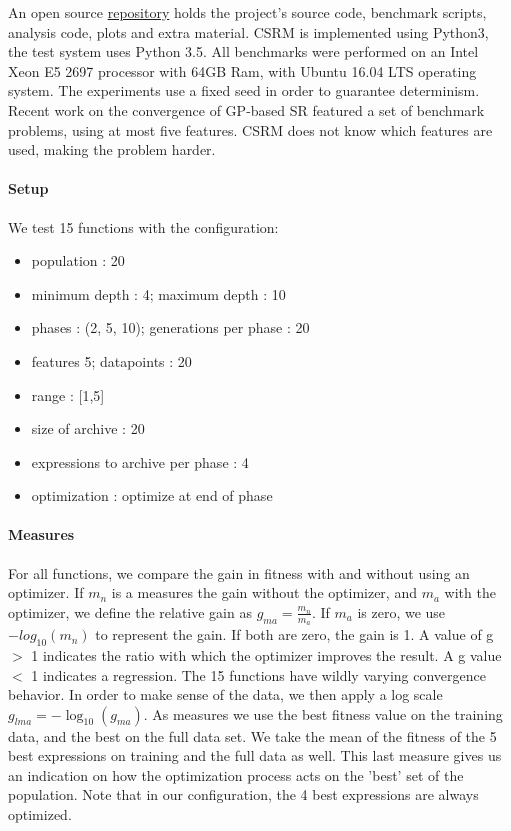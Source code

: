 An open source \href{https://bitbucket.org/bcardoen/csrm}{repository} holds the project's source code, benchmark scripts, analysis code, plots and extra material. CSRM is implemented using Python3, the test system uses Python 3.5. 
All benchmarks were performed on an Intel Xeon E5 2697 processor with 64GB Ram, with Ubuntu 16.04 LTS operating system. The experiments use a fixed seed in order to guarantee determinism. 
Recent work on the convergence of GP-based SR \cite{SRAccur, SRBaseline} featured a set of benchmark problems, using at most five features. CSRM does not know which features are used, making the problem harder. 
\paragraph{Setup}
We test 15 functions with the configuration:
\begin{itemize}
\item population : 20
\item minimum depth : 4; maximum depth : 10
\item phases : (2, 5, 10); generations per phase : 20
\item features 5; datapoints : 20
\item range : [1,5]
\item size of archive : 20
\item expressions to archive per phase : 4
\item optimization : optimize at end of phase
\end{itemize}
\paragraph{Measures}
For all functions, we compare the gain in fitness with and without using an optimizer. 
If $m_n$ is a measures the gain without the optimizer, and $m_a$ with the optimizer, we define the relative gain as $ g_{ma} = \frac{m_n}{m_a}$. If $m_a$ is zero, we use $-log_{10}(m_n)$ to represent the gain. If both are zero, the gain is 1. A value of g $>$ 1 indicates the ratio with which the optimizer improves the result. A g value $<$ 1 indicates a regression. The 15 functions have wildly varying convergence behavior. In order to make sense of the data, we then apply a log scale $ g_{lma} = - \log_{10}(g_{ma}) $.
As measures we use the best fitness value on the training data, and the best on the full data set. We take the mean of the fitness of the 5 best expressions on training and the full data as well. This last measure gives us an indication on how the optimization process acts on the 'best' set of the population. Note that in our configuration, the 4 best expressions are always optimized.
